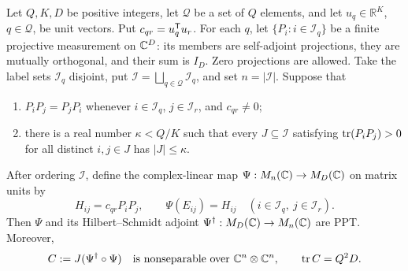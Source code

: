 \begin{proposition}
\label{prop:projection-criterion}
Let \(Q,K,D\) be positive integers, let \(\mathcal Q\) be a set of
\(Q\) elements, and let \(u_q\in\mathbb R^K\), \(q\in\mathcal Q\), be
unit vectors.  Put \(c_{qr}=u_q^{\mathsf T}u_r\).  For each \(q\), let
\(\{P_i:i\in\mathcal I_q\}\) be a finite projective measurement on
\(\mathbb C^D\): its members are self-adjoint projections, they are mutually
orthogonal, and their sum is \(I_D\).  Zero projections are allowed.
Take the label sets \(\mathcal I_q\) disjoint, put
\(\mathcal I=\bigsqcup_{q\in\mathcal Q}\mathcal I_q\), and set
\(n=|\mathcal I|\).  Suppose that
\begin{enumerate}
 \item \(P_iP_j=P_jP_i\) whenever \(i\in\mathcal I_q\),
       \(j\in\mathcal I_r\), and \(c_{qr}\ne0\);
 \item there is a real number \(\kappa<Q/K\) such that every
       \(J\subseteq\mathcal I\) satisfying
       \(\operatorname{tr}(P_iP_j)>0\) for all distinct \(i,j\in J\) has
       \(|J|\leq\kappa\).
\end{enumerate}
After ordering \(\mathcal I\), define the complex-linear map
\(\Psi:M_{n}(\mathbb C)\to M_{D}(\mathbb C)\) on matrix units by
\begin{equation}\label{eq:projection-map}
 H_{ij}=c_{qr}P_iP_j,\qquad
 \Psi(E_{ij})=H_{ij}
 \quad(i\in\mathcal I_q,\ j\in\mathcal I_r).
\end{equation}
Then \(\Psi\) and its Hilbert--Schmidt adjoint
\(\Psi^\dagger:M_{D}(\mathbb C)\to M_{n}(\mathbb C)\) are PPT.  Moreover,
\begin{equation}\label{eq:projection-composite}
 C:=J(\Psi^\dagger\circ\Psi)
 \quad\text{is nonseparable over }\mathbb C^n\otimes\mathbb C^n,
 \qquad \operatorname{tr} C=Q^2D.
\end{equation}
\end{proposition}

